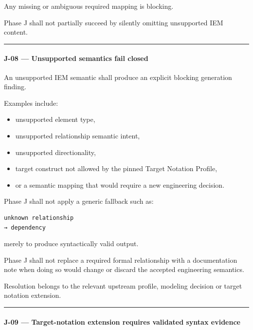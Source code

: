 Any missing or ambiguous required mapping is blocking.

Phase J shall not partially succeed by silently omitting unsupported IEM content.

\begin{center}\rule{0.5\linewidth}{0.5pt}\end{center}

\hypertarget{j-08--unsupported-semantics-fail-closed}{%
\paragraph{J-08 --- Unsupported semantics fail closed}\label{j-08--unsupported-semantics-fail-closed}}

An unsupported IEM semantic shall produce an explicit blocking generation finding.

Examples include:

\begin{itemize}
\tightlist
\item
  unsupported element type,
\item
  unsupported relationship semantic intent,
\item
  unsupported directionality,
\item
  target construct not allowed by the pinned Target Notation Profile,
\item
  or a semantic mapping that would require a new engineering decision.
\end{itemize}

Phase J shall not apply a generic fallback such as:

\begin{verbatim}
unknown relationship
→ dependency
\end{verbatim}

merely to produce syntactically valid output.

Phase J shall not replace a required formal relationship with a documentation note when doing so would change or discard the accepted engineering semantics.

Resolution belongs to the relevant upstream profile, modeling decision or target notation extension.

\begin{center}\rule{0.5\linewidth}{0.5pt}\end{center}

\hypertarget{j-09--target-notation-extension-requires-validated-syntax-evidence}{%
\paragraph{J-09 --- Target-notation extension requires validated syntax evidence}\label{j-09--target-notation-extension-requires-validated-syntax-evidence}}

